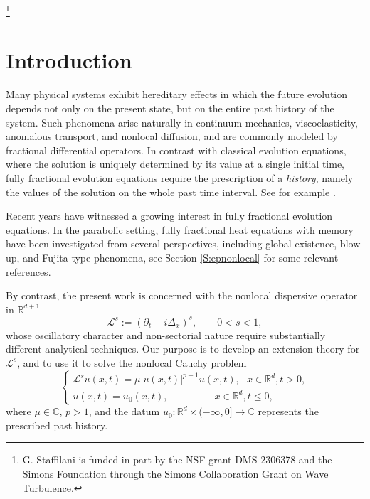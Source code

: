 \documentclass[11pt,letter]{amsart}
\def \RNu {\mathbb{R}^{d+1}}
\newcommand{\Rd}{\mathbb R^d}
\numberwithin{equation}{section}
\newcommand{\Le}{\mathcal L}
\numberwithin{equation}{section}
\begin{document}
\thanks{G. Staffilani is funded in part by the NSF grant DMS-2306378 and the Simons Foundation through the Simons
Collaboration Grant on Wave Turbulence.}
	
\maketitle
	
\tableofcontents

\section{Introduction}\label{S:intro}

Many physical systems exhibit hereditary effects in which the future evolution
depends not only on the present state, but on the entire past history of the
system. Such phenomena arise naturally in continuum mechanics, viscoelasticity,
anomalous transport, and nonlocal diffusion, and are commonly modeled by
fractional differential operators. In contrast with classical evolution
equations, where the solution is uniquely determined by its value at a single
initial time, fully fractional evolution equations require the prescription of a
\emph{history}, namely the values of the solution on the whole past time
interval. See for example \cite{CM, Mainardi, MK, DGLZ}.

Recent years have witnessed a growing interest in fully fractional evolution equations. In the parabolic setting, fully fractional heat equations with memory have been investigated from several perspectives, including global existence, blow-up, and Fujita-type phenomena, see Section \ref{S:epnonlocal} for some relevant references.

By contrast, the present work is concerned with the nonlocal dispersive operator in $\RNu$
\[
\mathcal L^s :=(\partial_t-i\Delta_x)^s,
\qquad 0<s<1,
\]
whose oscillatory character and non-sectorial nature require substantially
different analytical techniques. Our purpose is to develop an extension theory
for $\Le^s$, and to use it to solve the nonlocal Cauchy problem
\begin{equation}\label{cpmem}
\begin{cases}
\mathcal L^s u(x,t) = \mu |u(x,t)|^{p-1} u(x,t),\ \ \ x\in \Rd, t>0,
\\
u(x,t) = u_0(x,t),\ \ \ \ \ \ \ \ \ \ \ \ \ \ \ \ \ \ \ \ \ x\in \Rd, t\le 0,
\end{cases}
\end{equation}
where $\mu\in\mathbb C$, $p>1$, and the datum
$u_0:\mathbb R^d\times(-\infty,0]\longrightarrow\mathbb C$
represents the prescribed past history.
\end{document}
